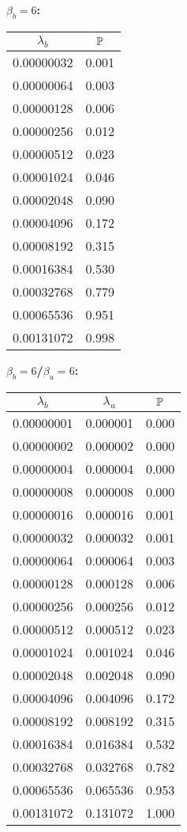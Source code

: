 \FloatBarrier
\begin{minipage}{.4\textwidth}
{\bf \(\beta_b=6\):}
\begin{tabular}{|c|c|}
\(\lambda_b\) & \(\P\) \\ \hline
0.00000032 & 0.001 \\ \hline
0.00000064 & 0.003 \\ \hline
0.00000128 & 0.006 \\ \hline
0.00000256 & 0.012 \\ \hline
0.00000512 & 0.023 \\ \hline
0.00001024 & 0.046 \\ \hline
0.00002048 & 0.090 \\ \hline
0.00004096 & 0.172 \\ \hline
0.00008192 & 0.315 \\ \hline
0.00016384 & 0.530 \\ \hline
0.00032768 & 0.779 \\ \hline
0.00065536 & 0.951 \\ \hline
0.00131072 & 0.998 \\ \hline
\end{tabular}
\end{minipage}
\begin{minipage}{.2\textwidth}
{\bf \(\beta_b=6\)/\(\beta_u=6\):}
\begin{tabular}{|c|c|c|}
\(\lambda_b\) & \(\lambda_u\) & \(\P\) \\ \hline
0.00000001 & 0.000001 & 0.000 \\ \hline
0.00000002 & 0.000002 & 0.000 \\ \hline
0.00000004 & 0.000004 & 0.000 \\ \hline
0.00000008 & 0.000008 & 0.000 \\ \hline
0.00000016 & 0.000016 & 0.001 \\ \hline
0.00000032 & 0.000032 & 0.001 \\ \hline
0.00000064 & 0.000064 & 0.003 \\ \hline
0.00000128 & 0.000128 & 0.006 \\ \hline
0.00000256 & 0.000256 & 0.012 \\ \hline
0.00000512 & 0.000512 & 0.023 \\ \hline
0.00001024 & 0.001024 & 0.046 \\ \hline
0.00002048 & 0.002048 & 0.090 \\ \hline
0.00004096 & 0.004096 & 0.172 \\ \hline
0.00008192 & 0.008192 & 0.315 \\ \hline
0.00016384 & 0.016384 & 0.532 \\ \hline
0.00032768 & 0.032768 & 0.782 \\ \hline
0.00065536 & 0.065536 & 0.953 \\ \hline
0.00131072 & 0.131072 & 1.000 \\ \hline
\end{tabular}
\end{minipage}
